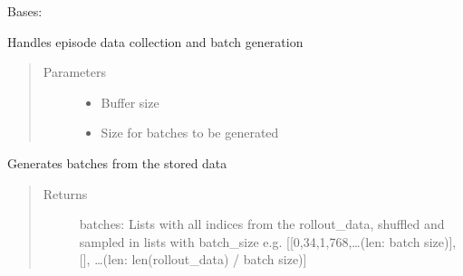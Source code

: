 \documentclass[letterpaper,10pt,english]{sphinxmanual}
\begin{document}
\begin{fulllineitems}
\label{\detokenize{agents.reinforcement_learning:agents.reinforcement_learning.ppo_masked.RolloutBuffer}}
\sphinxAtStartPar
Bases: 

\sphinxAtStartPar
Handles episode data collection and batch generation
\begin{quote}\begin{description}
\item[{Parameters}] \leavevmode\begin{itemize}
\item {} 
\sphinxAtStartPar
{} \textendash{} Buffer size

\item {} 
\sphinxAtStartPar
{} \textendash{} Size for batches to be generated

\end{itemize}

\end{description}\end{quote}

\begin{fulllineitems}
\label{\detokenize{agents.reinforcement_learning:agents.reinforcement_learning.ppo_masked.RolloutBuffer.__init__}}
\end{fulllineitems}


\begin{fulllineitems}
\label{\detokenize{agents.reinforcement_learning:agents.reinforcement_learning.ppo_masked.RolloutBuffer.generate_batches}}
\sphinxAtStartPar
Generates batches from the stored data
\begin{quote}\begin{description}
\item[{Returns}] \leavevmode
\sphinxAtStartPar
batches: Lists with all indices from the rollout\_data, shuffled and sampled in lists with batch\_size
e.g. {[}{[}0,34,1,768,…(len: batch size){]}, {[}{]}, …(len: len(rollout\_data) / batch size){]}


\end{description}
\end{quote}
\end{fulllineitems}
\end{fulllineitems}
\end{document}
